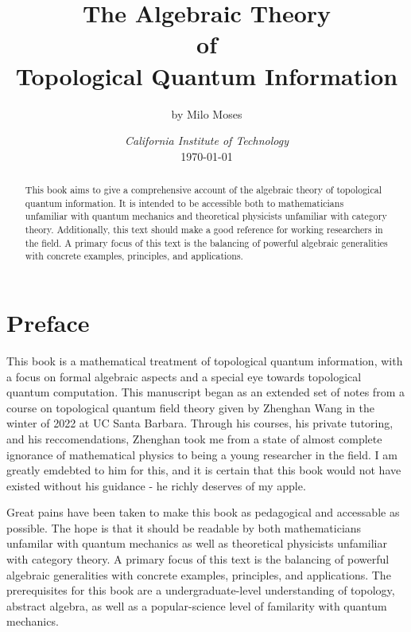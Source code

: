 \documentclass{article}
\title{The Algebraic Theory\\ of \\ Topological Quantum Information}
\author{by Milo Moses}
\date{\textit{California Institute of Technology} \\ [2ex] \today}
\theoremstyle{definition}
\numberwithin{figure}{section}
\begin{document}
\maketitle

\newcommand{\wind}{\mathrm{wind}}
\newcommand{\Free}{\mathrm{Free}}
\newcommand{\Sym}{\mathrm{Sym}}


\newcommand{\RR}{\mathbb{R}}
\newcommand{\ZZ}{\mathbb{Z}}
\newcommand{\QQ}{\mathbb{Q}}
\newcommand{\CC}{\mathbb{C}}
\newcommand{\SO}{\mathrm{SO}}


\newcommand{\0}{\left|0\right>}
\newcommand{\1}{\left|1\right>}



\begin{abstract}
This book aims to give a comprehensive account of the algebraic theory of topological quantum information. It is intended to be accessible both to mathematicians unfamiliar with quantum mechanics and theoretical physicists unfamiliar with category theory. Additionally, this text should make a good reference for working researchers in the field. A primary focus of this text is the balancing of powerful algebraic generalities with concrete examples, principles, and applications.
\end{abstract}


\newpage

\tableofcontents

\newpage


\section{Preface}
\label{Preface}

This book is a mathematical treatment of topological quantum information, with a focus on formal algebraic aspects and a special eye towards topological quantum computation. This manuscript began as an extended set of notes from a course on topological quantum field theory given by Zhenghan Wang in the winter of 2022 at UC Santa Barbara. Through his courses, his private tutoring, and his reccomendations, Zhenghan took me from a state of almost complete ignorance of mathematical physics to being a young researcher in the field. I am greatly emdebted to him for this, and it is certain that this book would not have existed without his guidance - he richly deserves of my apple.

Great pains have been taken to make this book as pedagogical and accessable as possible. The hope is that it should be readable by both mathematicians unfamilar with quantum mechanics as well as theoretical physicists unfamiliar with category theory. A primary focus of this text is the balancing of powerful algebraic generalities with concrete examples, principles, and applications. The prerequisites for this book are a undergraduate-level understanding of topology, abstract algebra, as well as a popular-science level of familarity with quantum mechanics.
\end{document}
